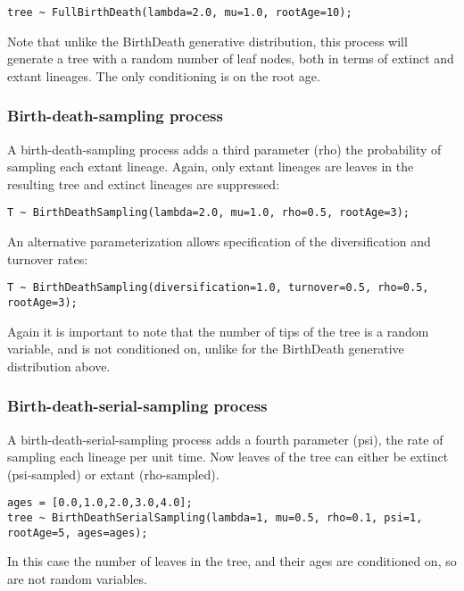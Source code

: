 \documentclass[oneside]{article}
\begin{document}
\begin{verbatim}
tree ~ FullBirthDeath(lambda=2.0, mu=1.0, rootAge=10);
\end{verbatim}

Note that unlike the BirthDeath generative distribution, this process will generate a tree with a random number of
leaf nodes, both in terms of extinct and extant lineages. The only conditioning is on the root age.

\subsubsection{Birth-death-sampling process}

A birth-death-sampling process adds a third parameter (rho) the probability of sampling each extant lineage. Again, 
only extant lineages are leaves in the resulting tree and extinct lineages are suppressed:

\begin{verbatim}
T ~ BirthDeathSampling(lambda=2.0, mu=1.0, rho=0.5, rootAge=3);
\end{verbatim}

An alternative parameterization allows specification of the diversification and turnover rates:

\begin{verbatim}
T ~ BirthDeathSampling(diversification=1.0, turnover=0.5, rho=0.5, rootAge=3);
\end{verbatim}

Again it is important to note that the number of tips of the tree is a random variable, and is not conditioned on,
unlike for the BirthDeath generative distribution above.

\subsubsection{Birth-death-serial-sampling process}

A birth-death-serial-sampling \cite{stadler2013dating} process adds a fourth parameter (psi), the rate of sampling each lineage per unit time. 
Now leaves of the tree can either be extinct (psi-sampled) or extant (rho-sampled). 

\begin{verbatim}
ages = [0.0,1.0,2.0,3.0,4.0];
tree ~ BirthDeathSerialSampling(lambda=1, mu=0.5, rho=0.1, psi=1, rootAge=5, ages=ages);
\end{verbatim}

In this case the number of leaves in the tree, and their ages are conditioned on, so are not random variables.
\end{document}
